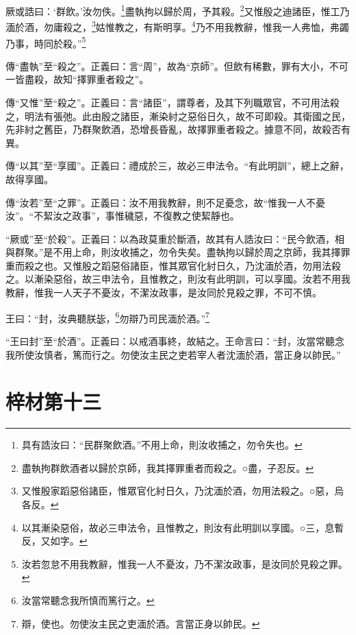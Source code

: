 厥或誥曰：‘群飲。’汝勿佚。\footnote{具有誥汝曰：“民群聚飲酒。”不用上命，則汝收捕之，勿令失也。}盡執拘以歸於周，予其殺。\footnote{盡執拘群飲酒者以歸於京師，我其擇罪重者而殺之。○盡，子忍反。}又惟殷之迪諸臣，惟工乃湎於酒，勿庸殺之，\footnote{又惟殷家蹈惡俗諸臣，惟眾官化紂日久，乃沈湎於酒，勿用法殺之。○惡，烏各反。}姑惟教之，有斯明享。\footnote{以其漸染惡俗，故必三申法令，且惟教之，則汝有此明訓以享國。○三，息暫反，又如字。}乃不用我教辭，惟我一人弗恤，弗蠲乃事，時同於殺。”\footnote{汝若忽怠不用我教辭，惟我一人不憂汝，乃不潔汝政事，是汝同於見殺之罪。}


{\noindent\zhuan{}\fzbyks 傳“盡執”至“殺之”。正義曰：言“周”，故為“京師”。但飲有稀數，罪有大小，不可一皆盡殺，故知“擇罪重者殺之”。 \par}

{\noindent\zhuan{}\fzbyks 傳“又惟”至“殺之”。正義曰：言“諸臣”，謂尊者，及其下列職眾官，不可用法殺之，明法有張弛。此由殷之諸臣，漸染紂之惡俗日久，故不可即殺。其衛國之民，先非紂之舊臣，乃群聚飲酒，恐增長昏亂，故擇罪重者殺之。據意不同，故殺否有異。 \par}

{\noindent\zhuan{}\fzbyks 傳“以其”至“享國”。正義曰：禮成於三，故必三申法令。“有此明訓”，總上之辭，故得享國。 \par}

{\noindent\zhuan{}\fzbyks 傳“汝若”至“之罪”。正義曰：汝不用我教辭，則不足憂念，故“惟我一人不憂汝”。“不絜汝之政事”，事惟穢惡，不復教之使絜靜也。 \par}

{\noindent\shu{}\fzkt “厥或”至“於殺”。正義曰：以為政莫重於斷酒，故其有人誥汝曰：“民今飲酒，相與群聚。”是不用上命，則汝收捕之，勿令失矣。盡執拘以歸於周之京師，我其擇罪重而殺之也。又惟殷之蹈惡俗諸臣，惟其眾官化紂日久，乃沈湎於酒，勿用法殺之。以漸染惡俗，故三申法令，且惟教之，則汝有此明訓，可以享國。汝若不用我教辭，惟我一人天子不憂汝，不潔汝政事，是汝同於見殺之罪，不可不慎。 \par}

王曰：“封，汝典聽朕毖，\footnote{汝當常聽念我所慎而篤行之。}勿辯乃司民湎於酒。”\footnote{辯，使也。勿使汝主民之吏湎於酒。言當正身以帥民。}

{\noindent\shu{}\fzkt “王曰封”至“於酒”。正義曰：以戒酒事終，故結之。王命言曰：“封，汝當常聽念我所使汝慎者，篤而行之。勿使汝主民之吏若宰人者沈湎於酒，當正身以帥民。” \par}

\section{梓材第十三}


